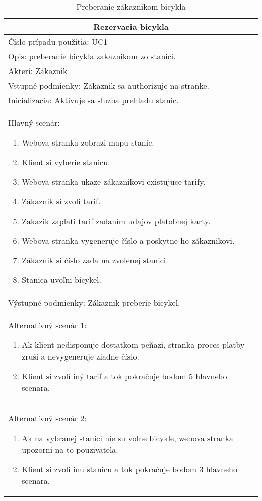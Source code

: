 \begin{table}[h]
  \centering
  \begin{tabular}{|p{12cm}|}
   \hline
   \multicolumn{1}{|c|}{ \textbf{Rezervacia bicykla}} \\
   \hline
   Číslo prípadu použitia: UC1\\
   \hline
   Opis: preberanie bicykla zakaznikom zo stanici.\\
   \hline
   Akteri: Zákaznik\\
   \hline
   Vstupné podmienky: Zákaznik sa authorizuje na stranke.\\
   \hline
   Inicializacia: Aktivuje sa sluzba prehladu stanic.\\
   \hline
   Hlavný scenár:
   \begin{enumerate} 
       \item Webova stranka zobrazi mapu stanic.
       \item Klient si vyberie stanicu.
       \item Webova stranka ukaze zákaznikovi existujuce tarify.
       \item Zákaznik si zvoli tarif. 
       \item Zakazik zaplati tarif zadaním udajov platobnej karty.
       \item Webova stranka vygeneruje číslo a poskytne ho zákaznikovi.
       \item Zákaznik si číslo zada na zvolenej stanici.
       \item Stanica uvoľni bicykel.
   \end{enumerate}\\
   \hline
   Výstupné podmienky: Zákaznik preberie bicykel.\\
   \hline
   Alternatívný scenár 1:
   \begin{enumerate} 
       \item Ak klient nedisponuje dostatkom peňazi, stranka proces
             platby zruši a nevygeneruje ziadne číslo. 
       \item Klient si zvolí iný tarif a tok pokračuje bodom 5 hlavneho scenara.
   \end{enumerate}\\
   \hline
   Alternatívný scenár 2:
   \begin{enumerate} 
       \item Ak na vybranej stanici nie su volne bicykle, webova stranka 
             upozorni na to pouzivatela. 
       \item Klient si zvoli inu stanicu a tok pokračuje bodom 3 hlavneho scenara.
   \end{enumerate}\\
   \hline
  \end{tabular}
  \caption{Preberanie zákaznikom bicykla}
  \label{tab:use_case_steps}
\end{table}

